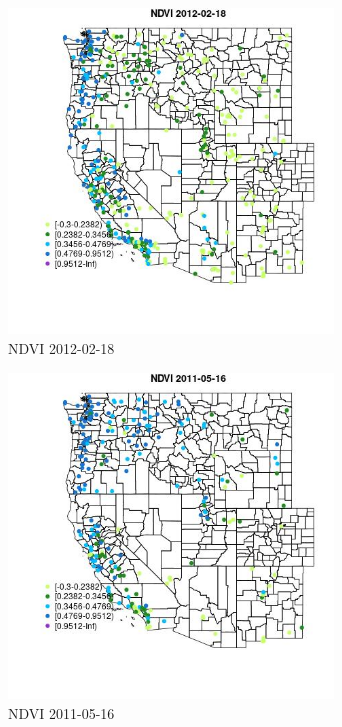 \begin{figure} 
\centering  
\includegraphics[width=0.77\textwidth]{Code_Outputs/Report_ML_input_PM25_Step4_part_f_de_duplicated_aves_prioritize_24hr_obswNAs_MapObsNDVI2012-02-18.jpg} 
\caption{\label{fig:Report_ML_input_PM25_Step4_part_f_de_duplicated_aves_prioritize_24hr_obswNAsMapObsNDVI2012-02-18}NDVI 2012-02-18} 
\end{figure} 
 

\clearpage 

\begin{figure} 
\centering  
\includegraphics[width=0.77\textwidth]{Code_Outputs/Report_ML_input_PM25_Step4_part_f_de_duplicated_aves_prioritize_24hr_obswNAs_MapObsNDVI2011-05-16.jpg} 
\caption{\label{fig:Report_ML_input_PM25_Step4_part_f_de_duplicated_aves_prioritize_24hr_obswNAsMapObsNDVI2011-05-16}NDVI 2011-05-16} 
\end{figure} 
 

